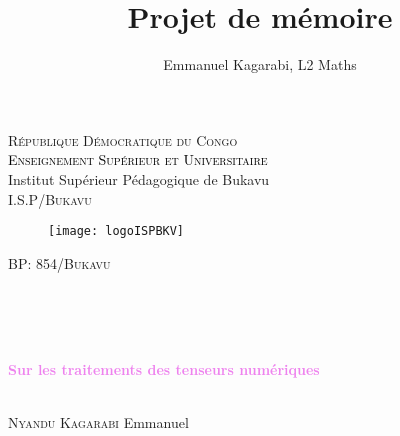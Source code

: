\documentclass[11pt,a4paper,oneside]{book}
\author{Emmanuel Kagarabi, L2 Maths}
\title{Projet de mémoire}
\begin{document}
\fancyhead{}
\fancyhead[LE]{\textit{\nouppercase{\leftmark}}}
\fancyhead[LO]{\textit{\nouppercase{\rightmark}}}
\fancyfoot[R]{}
\rhead{\thepage}
\cfoot{}

\begin{titlepage}
	
	\begin{center}
		\large \textrm{\textsc{République Démocratique du Congo}}\\
		\vspace{0.2cm}
		\large
		\textcolor{black}{\textsc{Enseignement Supérieur et Universitaire}}	\\
		\vspace{0.2cm}
		\large Institut Supérieur Pédagogique de Bukavu\\
		\Large
		\vspace{0.2cm}
		\textsc{I.S.P/Bukavu}
		\begin{figure}[!h]
			\centering
			\texttt{[image: logoISPBKV]}
			\label{fig:logoispbkv}
		\end{figure}
		
		
		\Large
		\textsc{BP: 854/Bukavu}\\
		\vspace{0.2cm}
		{}\emph{\\}
		\vspace{0.2cm}
		{}\\
		\vspace{0.3cm}
		
		\hrulefill	
		
		\emph{\\}
		
	{\sffamily \bfseries\Huge
	\noindent\textcolor{violet}{Sur les traitements des tenseurs numériques}}
			\emph{\\}
			
		\hrulefill
		
		
		\normalsize
		
		
		\vspace{0.4cm}
		\Large
		\begin{flushleft}
			\hspace{7cm}
			{ }\\
			\hspace{6cm}
			\textsc{Nyandu Kagarabi } Emmanuel\\
			

\end{flushleft}
\end{center}
\end{titlepage}
\end{document}
